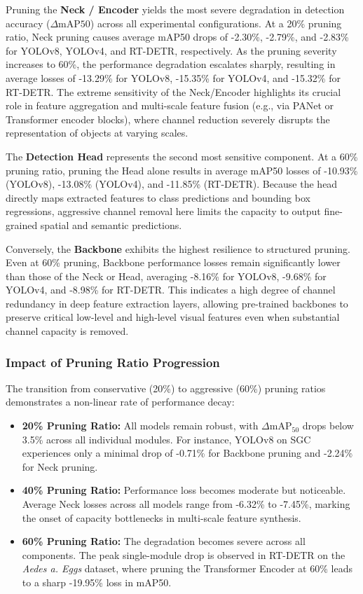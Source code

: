 Pruning the \textbf{Neck / Encoder} yields the most severe degradation in detection accuracy ($\Delta\text{mAP50}$) across all experimental configurations. At a 20\% pruning ratio, Neck pruning causes average mAP50 drops of -2.30\%, -2.79\%, and -2.83\% for YOLOv8, YOLOv4, and RT-DETR, respectively. As the pruning severity increases to 60\%, the performance degradation escalates sharply, resulting in average losses of -13.29\% for YOLOv8, -15.35\% for YOLOv4, and -15.32\% for RT-DETR. The extreme sensitivity of the Neck/Encoder highlights its crucial role in feature aggregation and multi-scale feature fusion (e.g., via PANet or Transformer encoder blocks), where channel reduction severely disrupts the representation of objects at varying scales.

The \textbf{Detection Head} represents the second most sensitive component. At a 60\% pruning ratio, pruning the Head alone results in average mAP50 losses of -10.93\% (YOLOv8), -13.08\% (YOLOv4), and -11.85\% (RT-DETR). Because the head directly maps extracted features to class predictions and bounding box regressions, aggressive channel removal here limits the capacity to output fine-grained spatial and semantic predictions.

Conversely, the \textbf{Backbone} exhibits the highest resilience to structured pruning. Even at 60\% pruning, Backbone performance losses remain significantly lower than those of the Neck or Head, averaging -8.16\% for YOLOv8, -9.68\% for YOLOv4, and -8.98\% for RT-DETR. This indicates a high degree of channel redundancy in deep feature extraction layers, allowing pre-trained backbones to preserve critical low-level and high-level visual features even when substantial channel capacity is removed.

\subsubsection{Impact of Pruning Ratio Progression}
The transition from conservative (20\%) to aggressive (60\%) pruning ratios demonstrates a non-linear rate of performance decay:
\begin{itemize}
    \item \textbf{20\% Pruning Ratio:} All models remain robust, with $\Delta\mathrm{mAP}_{50}$ drops below 3.5\% across all individual modules. For instance, YOLOv8 on SGC experiences only a minimal drop of -0.71\% for Backbone pruning and -2.24\% for Neck pruning.
    \item \textbf{40\% Pruning Ratio:} Performance loss becomes moderate but noticeable. Average Neck losses across all models range from -6.32\% to -7.45\%, marking the onset of capacity bottlenecks in multi-scale feature synthesis.
    \item \textbf{60\% Pruning Ratio:} The degradation becomes severe across all components. The peak single-module drop is observed in RT-DETR on the \textit{Aedes a. Eggs} dataset, where pruning the Transformer Encoder at 60\% leads to a sharp -19.95\% loss in mAP50.
\end{itemize}

